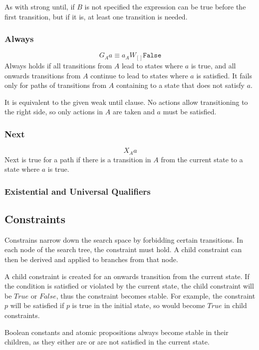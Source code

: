 \documentclass[a4paper,11pt]{article}
\begin{document}
	As with strong until, if $B$ is not specified the expression can be true before the first transition, but if it is, at least one transition is needed.
	
	\subsubsection{Always}
	$$G{_Aa} \equiv a _A W{_{[]} \texttt{False}} $$
	Always holds if all transitions from $A$ lead to states where $a$ is true, and all onwards transitions from $A$ continue to lead to states where $a$ is satisfied. It fails only for paths of transitions from $A$ containing to a state that does not satisfy $a$.
	
	It is equivalent to the given weak until clause. No actions allow transitioning to the right side, so only actions in $A$ are taken and $a$ must be satisfied.
	
	\subsubsection{Next}
	$$X{_Aa}$$
	Next is true for a path if there is a transition in $A$ from the current state to a state where $a$ is true. 
	
	\subsubsection{Existential and Universal Qualifiers}
	
	
	
	\subsection{Constraints}
	Constrains narrow down the search space by forbidding certain transitions. In each node of the search tree, the constraint must hold. A child constraint can then be derived and applied to branches from that node. 
	
	A child constraint is created for an onwards transition from the current state. If the condition is satisfied or violated by the current state, the child constraint will be $True$ or $False$, thus the constraint becomes stable. For example, the constraint $p$ will be satisfied if $p$ is true in the initial state, so would become $True$ in child constraints.
	
	Boolean constants and atomic propositions always become stable in their children, as they either are or are not satisfied in the current state.	
	
\end{document}
